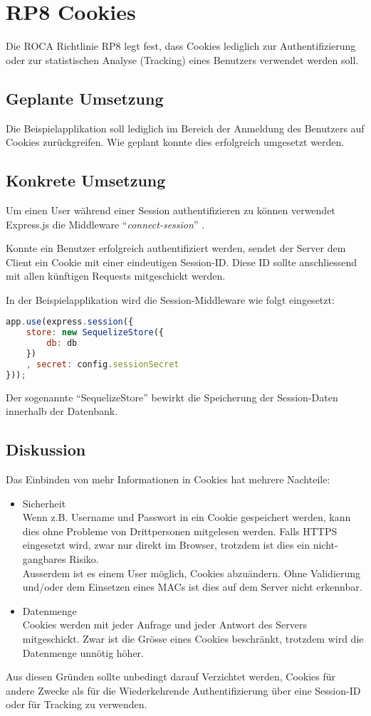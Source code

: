 \section{RP8 Cookies}
\label{sec:principle-rp8-cookies}
Die ROCA Richtlinie RP8 legt fest, dass Cookies lediglich zur Authentifizierung oder zur statistischen Analyse (Tracking) eines Benutzers verwendet werden soll.

\subsection*{Geplante Umsetzung}
Die Beispielapplikation soll lediglich im Bereich der Anmeldung des Benutzers auf Cookies zurückgreifen. Wie geplant konnte dies erfolgreich umgesetzt werden.

\subsection*{Konkrete Umsetzung}
Um einen User während einer Session authentifizieren zu können verwendet Express.js \cite{Expressjs} die \gls{Middleware} ``\emph{connect-session}'' \cite{ConnectSession}.

Konnte ein Benutzer erfolgreich authentifiziert werden, sendet der Server dem Client ein Cookie mit einer eindeutigen Session-ID. Diese ID sollte anschliessend mit allen künftigen Requests mitgeschickt werden.

In der Beispielapplikation wird die Session-Middleware wie folgt eingesetzt:

\begin{lstlisting}[language=JavaScript, caption=Connect Session Middleware \cite{RoomiesMiddlewareHttp}, label=lst:connect-session-middleware, firstnumber=31]
app.use(express.session({
	store: new SequelizeStore({
		db: db
	})
	, secret: config.sessionSecret
}));
\end{lstlisting}

Der sogenannte ``SequelizeStore'' \cite{SequelizeStore} bewirkt die Speicherung der Session-Daten innerhalb der Datenbank.

\subsection*{Diskussion}
Das Einbinden von mehr Informationen in Cookies hat mehrere Nachteile:
\begin{itemize}
	\item Sicherheit \\
		Wenn z.B. Username und Passwort in ein Cookie gespeichert werden, kann dies ohne Probleme von Drittpersonen mitgelesen werden. Falls HTTPS eingesetzt wird, zwar nur direkt im Browser, trotzdem ist dies ein nicht-gangbares Risiko. \\
		Ausserdem ist es einem User möglich, Cookies abzuändern. Ohne Validierung und/oder dem Einsetzen eines \glspl{MAC} ist dies auf dem Server nicht erkennbar.
	\item Datenmenge \\
		Cookies werden mit jeder Anfrage und jeder Antwort des Servers mitgeschickt. Zwar ist die Grösse eines Cookies beschränkt, trotzdem wird die Datenmenge unnötig höher.
\end{itemize}

Aus diesen Gründen sollte unbedingt darauf Verzichtet werden, Cookies für andere Zwecke als für die Wiederkehrende Authentifizierung über eine Session-ID oder für Tracking zu verwenden.